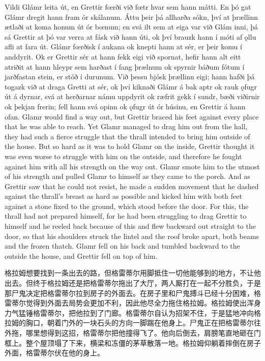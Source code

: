 \begin{paracol}{2}
    Vildi Glámr leita út, en Grettir fœrði við fœtr hvar sem hann mátti. En þó gat Glámr dregit hann fram ór skálanum. Áttu þeir þá allharða sókn, því at þrællinn ætlaði at koma honum út ór bœnum; en svá ilt sem at eiga var við Glám inni, þá sá Grettir at þó var verra at fásk við hann úti, ok því brauzk hann í móti af ǫllu afli at fara út. Glámr fœrðisk í aukana ok knepti hann at sér, er þeir komu í anddyrit. Ok er Grettir sér at hann fekk eigi við spornat, hefir hann alt eitt atriðit at hann hleypr sem harðast í fang þrælnum ok spyrnir báðum fótum í jarðfastan stein, er stóð í durunum. Við þessu bjósk þrællinn eigi; hann hafði þá togazk við at draga Gretti at sér, ok því kiknaði Glámr á bak aptr ok rauk ǫfugr út á dyrnar, svá at herðarnar námu uppdyrit ok ræfrit gekk í sundr, bæði viðirnir ok þekjan frerin; fell hann svá opinn ok ǫfugr út ór húsinu, en Grettir á hann ofan.
    \switchcolumn
    Glamr would find a way out, but Grettir braced his feet against every place that he was able to reach. Yet Glamr managed to drag him out from the hall, they had such a fierce struggle that the thrall intended to bring him outside of the house. But so hard as it was to hold Glamr on the inside, Grettir thought it was even worse to struggle with him on the outside, and therefore he fought against him with all his strength on the way out. Glamr smote him to the utmost of his strength and pulled Glamr to himself as they came to the porch. And as Grettir saw that he could not resist, he made a sudden movement that he dashed against the thrall's breast as hard as possible and kicked him with both feet against a stone fixed to the ground, which stood before the door. For this, the thrall had not prepared himself, for he had been struggling to drag Grettir to himself and he reeled back because of this and flew backward out straight to the door, so that his shoulders struck the lintel and the roof broke apart, both beams and the frozen thatch. Glamr fell on his back and tumbled backward to the outside the house, and Grettir fell on top of him.
\end{paracol}
\begin{translation*}{}
    格拉姆想要找到一条出去的路，但格雷蒂尔用脚抵住一切他能够到的地方，不让他出去。但终于格拉姆还是把格雷蒂尔拖出了大厅，两人厮打在一起不分胜负，于是那尸鬼决定把格雷蒂尔拉到房子的外面去。在房子里和尸鬼搏斗已经十分困难，格雷蒂尔觉得到外面去局势会更加不利，因此他尽全力拖住格拉姆。格拉姆使出浑身力气猛锤格雷蒂尔，把他拉到了门廊。格雷蒂尔自认为招架不住，于是猛地冲向格拉姆的胸口，朝着门外的一块石头的方向一脚踹在他身上。尸鬼正在把格雷蒂尔往外拖，哪里想得到这招，格雷蒂尔把他撞得飞了。他向后倒去，肩膀笔直地砸在门框上。整个屋顶塌了下来，横梁和冻僵的茅草散落一地。格拉姆仰躺着摔倒在房子外面，格雷蒂尔伏在他的身上。
\end{translation*}
